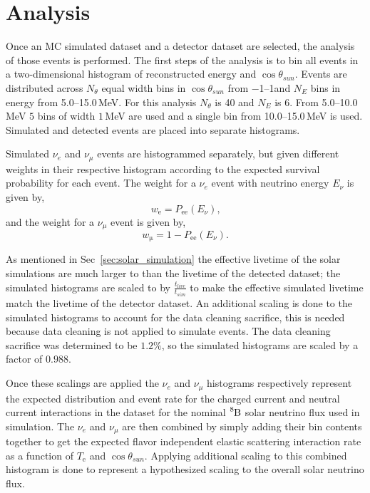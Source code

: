 \section{Analysis}
Once an MC simulated dataset and a detector dataset are selected, the analysis
of those events is performed.
The first steps of the analysis is to bin all events
in a two-dimensional histogram of reconstructed energy and $\cos\theta_{sun}$.
Events are distributed across $N_{\theta}$ equal width bins in $\cos\theta_{sun}$ from
\numrange{-1}{1}and
$N_{E}$ bins in energy from \numrange{5.0}{15.0}\,MeV.
For this analysis $N_{\theta}$ is 40 and $N_{E}$ is 6.
From \numrange{5.0}{10.0}\,MeV $5$ bins of width $1$\,MeV are used and
a single bin from \numrange{10.0}{15.0}\,MeV is used.
Simulated and detected events are placed into separate histograms.

Simulated $\nu_{e}$ and $\nu_{\mu}$ events are histogrammed separately,
but given different weights in their respective histogram according to the expected survival probability
for each event.
The weight for a $\nu_{e}$ event with neutrino energy $E_{\nu}$ is given by,
\begin{equation}
    w_{\mathrm{e}} = P_{\mathrm{ee}}(E_{\nu})\text{,}
\end{equation}
and the weight for a $\nu_{\mu}$ event is given by,
\begin{equation}
    w_{\mathrm{\mu}} = 1 - P_{\mathrm{ee}}(E_{\nu})\text{.}
\end{equation}

As mentioned in Sec~\ref{sec:solar_simulation}%
the effective livetime of the solar simulations are much larger to than
the livetime of the detected dataset; the simulated histograms are
scaled to by $\frac{t_{live}}{t_{sim}}$ to make the effective simulated
livetime match the livetime of the detector dataset.
An additional scaling is done to the simulated histograms to account
for the data cleaning sacrifice, this is needed because data cleaning
is not applied to simulate events.
The data cleaning sacrifice was determined to be $1.2\%$, so the
simulated histograms are scaled by a factor of $0.988$.

Once these scalings are applied the $\nu_{e}$ and $\nu_{\mu}$ histograms
respectively  represent the expected distribution and event rate for the charged current
and neutral current interactions in the dataset for the nominal $\ce{^{8}B}$
solar neutrino flux used in simulation.
The $\nu_{e}$ and $\nu_{\mu}$ are then combined by
simply adding their bin contents together to get the expected
flavor independent elastic scattering interaction rate as a function
of $T_{\mathrm{e}}$ and $\cos\theta_{sun}$.
Applying additional scaling to this combined histogram is done to represent
a hypothesized scaling to the overall solar neutrino flux.

